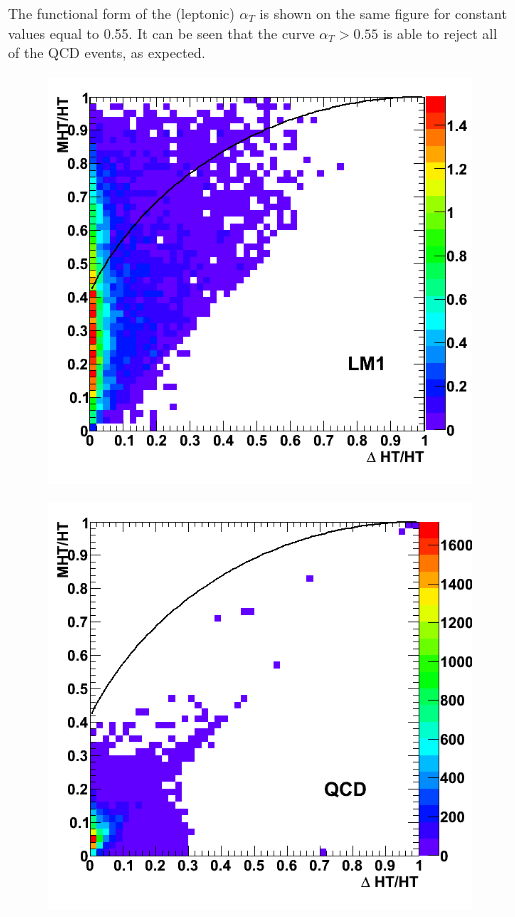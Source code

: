 The functional form of the (leptonic) $\alpha_{T}$ is shown on the same figure for constant values equal to 0.55. It can be seen that the curve $\alpha_{T}>0.55$ is able to reject all of the QCD events, as expected.


\begin{figure}[h!]
\begin{minipage}[b]{0.5\linewidth}
\centering
{\label{fig:lm1_cor}\includegraphics[scale=0.36]{./plots/lm1_cor.png}}
\end{minipage}
\hspace{3mm}
\begin{minipage}[b]{0.5\linewidth}
\centering
{\label{fig:qcd_cor}\includegraphics[scale=0.36]{./plots/qcd_cor.png}}

\end{minipage}
\end{figure}
